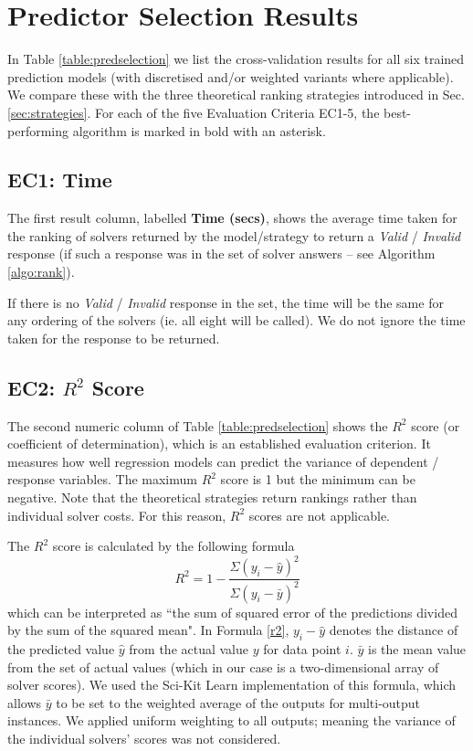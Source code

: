 \section{Predictor Selection Results}

\label{sec:pred-results}

In Table \ref{table:predselection} we list the cross-validation results for all six trained prediction models (with discretised and/or weighted variants where applicable).
We compare these  with the three theoretical ranking strategies introduced in Sec. \ref{sec:strategies}.
For each of the five Evaluation Criteria EC1-5, the best-performing algorithm is marked in bold with an asterisk. 

\subsection{EC1: Time}

The first result column, labelled \textbf{Time (secs)}, shows the average time taken for the ranking of solvers returned by the model/strategy to return a \textit{Valid} / \textit{Invalid} response (if such a response was in the set of solver answers -- see Algorithm \ref{algo:rank}).

If there is no \textit{Valid} / \textit{Invalid} response in the set, the time will be the same for any ordering of the solvers (ie. all eight will be called). 
We do not ignore the time taken for the response to be returned.

\subsection{EC2: $R^2$ Score}

The second numeric column of Table \ref{table:predselection} shows
the $R^2$ score (or coefficient of determination), which is an established evaluation criterion. 
It measures how well regression models can predict the variance of dependent / response variables. 
The maximum $R^2$ score is 1 but the minimum can be negative. Note that the theoretical strategies return rankings rather than individual solver costs. 
For this reason, $R^2$ scores are not applicable.

The $R^2$ score is calculated by the following formula
\begin{equation}
\label{r2}
R^2 = 1-\frac{\Sigma(y_i - \hat{y})^2}{\Sigma(y_i - \bar{y})^2}
\end{equation}
which can be interpreted as ``the sum of squared error of the predictions divided by the sum of the squared mean".  
In Formula \ref{r2}, $y_i -\hat{y}$ denotes the distance of the predicted value $\hat{y}$ from the actual value $y$ for data point $i$.
$\bar{y}$ is the mean value from the set of actual values (which in our case is a two-dimensional array of solver scores).
We used the Sci-Kit Learn implementation of this formula, which allows $\bar{y}$ to be set to the weighted average of the outputs for multi-output instances.
We applied uniform weighting to all outputs; meaning the variance of the individual solvers' scores was not considered. 

